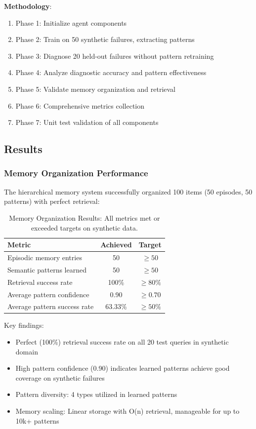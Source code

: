 \documentclass[11pt]{article}
\begin{document}
\textbf{Methodology}:
\begin{enumerate}
    \item Phase 1: Initialize agent components
    \item Phase 2: Train on 50 synthetic failures, extracting patterns
    \item Phase 3: Diagnose 20 held-out failures without pattern retraining
    \item Phase 4: Analyze diagnostic accuracy and pattern effectiveness
    \item Phase 5: Validate memory organization and retrieval
    \item Phase 6: Comprehensive metrics collection
    \item Phase 7: Unit test validation of all components
\end{enumerate}

\subsection{Results}

\subsubsection{Memory Organization Performance}

The hierarchical memory system successfully organized 100 items (50 episodes, 50 patterns) with perfect retrieval:

\begin{table}[h!]
\centering
\begin{tabular}{lcc}
\toprule
\textbf{Metric} & \textbf{Achieved} & \textbf{Target} \\
\midrule
Episodic memory entries & 50 & $\geq 50$ \\
Semantic patterns learned & 50 & $\geq 50$ \\
Retrieval success rate & 100\% & $\geq 80\%$ \\
Average pattern confidence & 0.90 & $\geq 0.70$ \\
Average pattern success rate & 63.33\% & $\geq 50\%$ \\
\bottomrule
\end{tabular}
\caption{Memory Organization Results: All metrics met or exceeded targets on synthetic data.}
\label{tab:memory_results}
\end{table}

Key findings:
\begin{itemize}
    \item Perfect (100\%) retrieval success rate on all 20 test queries in synthetic domain
    \item High pattern confidence (0.90) indicates learned patterns achieve good coverage on synthetic failures
    \item Pattern diversity: 4 types utilized in learned patterns
    \item Memory scaling: Linear storage with O(n) retrieval, manageable for up to 10k+ patterns
\end{itemize}
\end{document}
